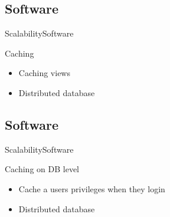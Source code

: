 \subsection{Software}
\begin{frame}{Scalability}{Software}
\begin{block}{Caching}
  \begin{itemize}
    \item Caching views 
    \item Distributed database
  \end{itemize}
\end{block}
\end{frame}

\subsection{Software}
\begin{frame}{Scalability}{Software}
\begin{block}{Caching on DB level}
  \begin{itemize}
    \item Cache a users privileges when they login
    \item Distributed database
  \end{itemize}
\end{block}
\end{frame}
